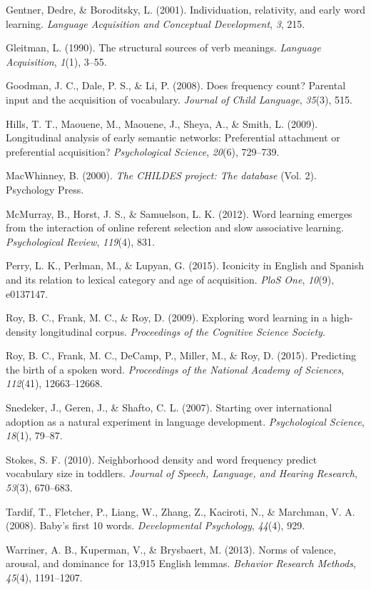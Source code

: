 \documentclass[10pt, letterpaper]{article}
\begin{document}
Gentner, Dedre, \& Boroditsky, L. (2001). Individuation, relativity, and
early word learning. \emph{Language Acquisition and Conceptual
Development}, \emph{3}, 215.

Gleitman, L. (1990). The structural sources of verb meanings.
\emph{Language Acquisition}, \emph{1}(1), 3--55.

Goodman, J. C., Dale, P. S., \& Li, P. (2008). Does frequency count?
Parental input and the acquisition of vocabulary. \emph{Journal of Child
Language}, \emph{35}(3), 515.

Hills, T. T., Maouene, M., Maouene, J., Sheya, A., \& Smith, L. (2009).
Longitudinal analysis of early semantic networks: Preferential
attachment or preferential acquisition? \emph{Psychological Science},
\emph{20}(6), 729--739.

MacWhinney, B. (2000). \emph{The CHILDES project: The database} (Vol.
2). Psychology Press.

McMurray, B., Horst, J. S., \& Samuelson, L. K. (2012). Word learning
emerges from the interaction of online referent selection and slow
associative learning. \emph{Psychological Review}, \emph{119}(4), 831.

Perry, L. K., Perlman, M., \& Lupyan, G. (2015). Iconicity in English
and Spanish and its relation to lexical category and age of acquisition.
\emph{PloS One}, \emph{10}(9), e0137147.

Roy, B. C., Frank, M. C., \& Roy, D. (2009). Exploring word learning in
a high-density longitudinal corpus. \emph{Proceedings of the Cognitive
Science Society}.

Roy, B. C., Frank, M. C., DeCamp, P., Miller, M., \& Roy, D. (2015).
Predicting the birth of a spoken word. \emph{Proceedings of the National
Academy of Sciences}, \emph{112}(41), 12663--12668.

Snedeker, J., Geren, J., \& Shafto, C. L. (2007). Starting over
international adoption as a natural experiment in language development.
\emph{Psychological Science}, \emph{18}(1), 79--87.

Stokes, S. F. (2010). Neighborhood density and word frequency predict
vocabulary size in toddlers. \emph{Journal of Speech, Language, and
Hearing Research}, \emph{53}(3), 670--683.

Tardif, T., Fletcher, P., Liang, W., Zhang, Z., Kaciroti, N., \&
Marchman, V. A. (2008). Baby's first 10 words. \emph{Developmental
Psychology}, \emph{44}(4), 929.

Warriner, A. B., Kuperman, V., \& Brysbaert, M. (2013). Norms of
valence, arousal, and dominance for 13,915 English lemmas.
\emph{Behavior Research Methods}, \emph{45}(4), 1191--1207.
\end{document}
